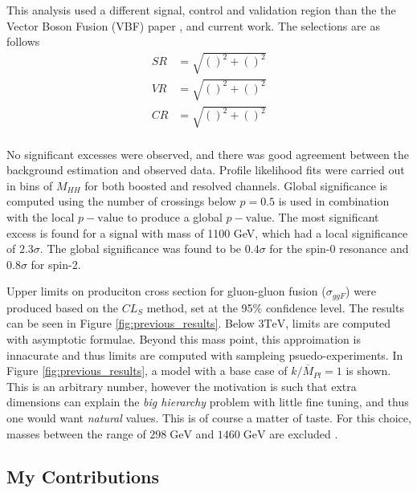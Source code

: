 \documentclass[12pt]{article}
\begin{document}
This analysis used a different signal, control and validation region than the
the Vector Boson Fusion (VBF) paper \cite{vbf_hh4b}, and current work. The
selections are as follows
\begin{align}
    SR &= \sqrt{\left(  \right)^2 + \left(  \right)^2} \\
    VR &= \sqrt{\left(  \right)^2 + \left(  \right)^2} \\
    CR &= \sqrt{\left(  \right)^2 + \left(  \right)^2} \\
\end{align}

No significant excesses were observed, and there was good agreement between the
background estimation and observed data. Profile likelihood fits were carried
out in bins of $M_{HH}$ for both boosted and resolved channels. Global
significance is computed using the number of crossings below $p=0.5$ is used in
combination with the local $p-\text{value}$ to produce a global
$p-\text{value}$. The most significant excess is found for a signal with mass of
1100 GeV, which had a local significance of $2.3\sigma$. The global significance
was found to be $0.4\sigma$ for the spin-0 resonance and $0.8\sigma$ for spin-2.

Upper limits on produciton cross section for gluon-gluon fusion ($\sigma_{ggF}$)
were produced based on the $CL_S$ method, set at the 95\% confidence level. The
results can be seen in Figure \ref{fig:previous_results}. Below $3 \text{TeV}$,
limits are computed with asymptotic formulae. Beyond this mass point, this
approimation is innacurate and thus limits are computed with sampleing
psuedo-experiments. In Figure \ref{fig:previous_results}, a model with a base
case of $k/\overline{M}_{Pl}=1$ is shown. This is an arbitrary number, however
the motivation is such that extra dimensions can explain the \textit{big
hierarchy} problem with little fine tuning, and thus one would want
\textit{natural} values. This is of course a matter of taste. For this choice,
masses between the range of $298\;\text{GeV}$ and $1460\;\text{GeV}$ are
excluded \cite{hh4b_resonant}.

\newpage
\subsection{My Contributions}
\end{document}
